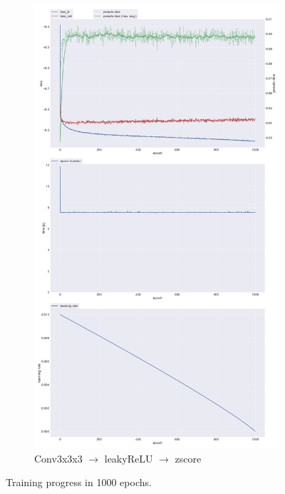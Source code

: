 \documentclass{article}
\begin{document}
\begin{figure}
\begin{subfigure}{0.49\textwidth}
    \includegraphics[width=\textwidth]{./figs/relunormprogress.png}
    \caption{Conv3x3x3 \(\rightarrow\) leakyReLU \(\rightarrow\) zscore}
    \label{progressb}
  \end{subfigure}
  \caption{Training progress in 1000 epochs.}
  \label{progress}
\end{figure}
\end{document}
